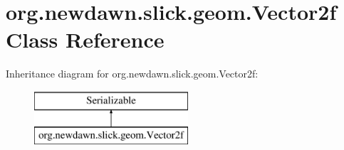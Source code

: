 \hypertarget{classorg_1_1newdawn_1_1slick_1_1geom_1_1_vector2f}{}\section{org.\+newdawn.\+slick.\+geom.\+Vector2f Class Reference}
\label{classorg_1_1newdawn_1_1slick_1_1geom_1_1_vector2f}
Inheritance diagram for org.\+newdawn.\+slick.\+geom.\+Vector2f\+:\begin{figure}[H]
\begin{center}
\leavevmode
\includegraphics[height=2.000000cm]{classorg_1_1newdawn_1_1slick_1_1geom_1_1_vector2f}
\end{center}
\end{figure}
